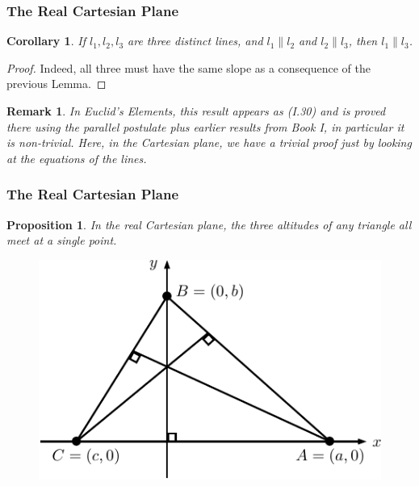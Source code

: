 \documentclass[compress,mathserif,serif]{beamer}
\newtheorem{Cor}{Corollary}
\newtheorem{prop}{Proposition}
\newtheorem{rem}{Remark}
\begin{document}
\begin{frame}
\frametitle{The Real Cartesian Plane}
\begin{Cor}If $l_1,l_2,l_3$ are three distinct lines, and $l_1 \| l_2$ and $l_2 \| l_3$, then $l_1 \| l_3$.
\end{Cor}
\pause
\begin{proof}
Indeed, all three must have the same slope as a consequence of the previous Lemma.
\end{proof}
\pause
\begin{rem}
In Euclid's \textit{Elements}, this result appears as (I.30) and is proved there using the parallel postulate plus earlier results from Book I, in particular it is non-trivial. Here, in the Cartesian plane, we have a trivial proof just by looking at the equations of the lines.
\end{rem}
\end{frame}

\begin{frame}
\frametitle{The Real Cartesian Plane}
\begin{prop} In the real Cartesian plane, the three altitudes of any triangle all meet at a single point.
\end{prop}
\begin{figure}[hbtp]
\centering
\includegraphics[scale=1]{prop1.pdf}
\end{figure}
\end{frame}
\end{document}
